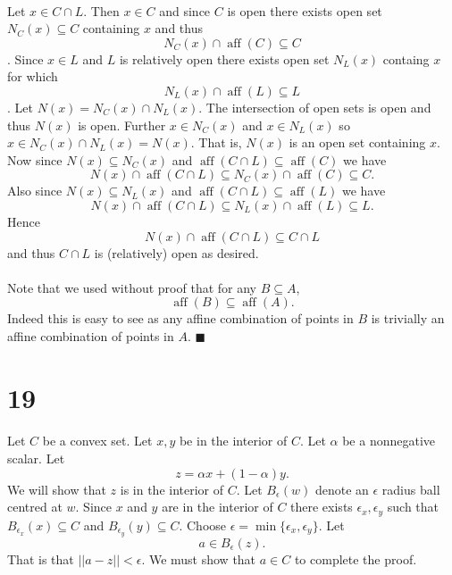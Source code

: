 \documentclass[letterpaper,12pt,oneside,onecolumn]{article}
\DeclareMathOperator{\aff}{aff}
\begin{document}
\paragraph{}
Let $x \in C \cap L$. Then $x \in C$ and since $C$ is open there exists open set $N_C(x)\subseteq C$ containing $x$ and thus $$N_C(x) \cap \aff(C) \subseteq C \label{eq:inC}$$. Since $x\in L$ and $L$ is relatively open there exists open set $N_L(x)$ containg $x$ for which $$ N_L(x) \cap \aff(L) \subseteq L$$. Let $N(x) = N_C(x) \cap N_L(x)$. The intersection of open sets is open and thus $N(x)$ is open. Further $x \in N_C(x)$ and $x \in N_L(x)$ so $x \in N_C(x) \cap N_L(x) = N(x)$. That is, $N(x)$ is an open set containing $x$. Now since $N(x) \subseteq N_C(x)$ and $\aff(C \cap L) \subseteq \aff(C)$ we have
$$N(x) \cap \aff(C \cap L) \subseteq N_C(x) \cap \aff(C) \subseteq C.$$
Also since $N(x) \subseteq N_L(x)$ and $\aff(C \cap L) \subseteq \aff(L)$ we have
$$N(x) \cap \aff(C \cap L) \subseteq N_L(x) \cap \aff(L) \subseteq L.$$
Hence $$N(x) \cap \aff(C\cap L) \subseteq C\cap L$$ and thus $C\cap L$ is (relatively) open as desired.
\paragraph{}
Note that we used without proof that for any $B \subseteq A$, $$\aff(B) \subseteq \aff(A).$$ Indeed this is easy to see as any affine combination of points in $B$ is trivially an affine combination of points in $A$. $\blacksquare$
\section*{19}
\paragraph{}
Let $C$ be a convex set. Let $x,y$ be in the interior of $C$. Let $\alpha$ be a nonnegative scalar. Let $$z = \alpha x + (1-\alpha)y.$$
We will show that $z$ is in the interior of $C$. Let $B_\epsilon(w)$ denote an $\epsilon$ radius ball centred at $w$. Since $x$ and $y$ are in the interior of $C$ there exists $\epsilon_x, \epsilon_y$ such that $B_{\epsilon_x}(x) \subseteq C$ and $B_{\epsilon_y}(y) \subseteq C$. Choose $\epsilon = \min\{\epsilon_x, \epsilon_y\}$. Let $$a \in B_\epsilon(z).$$
That is that $||a-z|| < \epsilon$. We must show that $a \in C$ to complete the proof.
\end{document}
